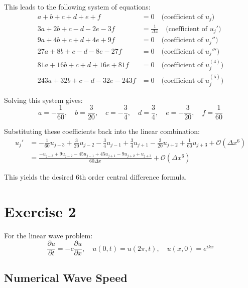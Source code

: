 \documentclass[a4paper, 12pt]{article}
\begin{document}
This leads to the following system of equations:
\begin{align*}
    a + b + c + d + e + f &= 0 \quad \text{(coefficient of } u_j) \\
    3a + 2b + c - d - 2e - 3f &= \frac{1}{\Delta x} \quad \text{(coefficient of } u_j') \\
    9a + 4b + c + d + 4e + 9f &= 0 \quad \text{(coefficient of } u_j'') \\
    27a + 8b + c - d - 8e - 27f &= 0 \quad \text{(coefficient of } u_j''') \\
    81a + 16b + c + d + 16e + 81f &= 0 \quad \text{(coefficient of } u_j^{(4)}) \\
    243a + 32b + c - d - 32e - 243f &= 0 \quad \text{(coefficient of } u_j^{(5)})
\end{align*}

Solving this system gives:
\begin{equation*}
    a = -\frac{1}{60}, \quad b = \frac{3}{20}, \quad c = -\frac{3}{4}, \quad d = \frac{3}{4}, \quad e = -\frac{3}{20}, \quad f = \frac{1}{60}
\end{equation*}

Substituting these coefficients back into the linear combination:
\begin{align*}
    u_j' &= -\frac{1}{60}u_{j-3} + \frac{3}{20}u_{j-2} - \frac{3}{4}u_{j-1} + \frac{3}{4}u_{j+1} - \frac{3}{20}u_{j+2} + \frac{1}{60}u_{j+3} + \mathcal{O}(\Delta x^6) \\
         &= \frac{-u_{j-3} + 9u_{j-2} - 45u_{j-1} + 45u_{j+1} - 9u_{j+2} + u_{j+3}}{60\Delta x} + \mathcal{O}(\Delta x^6)
\end{align*}

This yields the desired 6th order central difference formula.

\section*{Exercise 2}

For the linear wave problem:
\begin{equation}
    \frac{\partial u}{\partial t} = -c \frac{\partial u}{\partial x}, \quad u(0,t) = u(2\pi, t), \quad u(x,0) = e^{ikx}
\end{equation}

\subsection*{Numerical Wave Speed}
\end{document}
